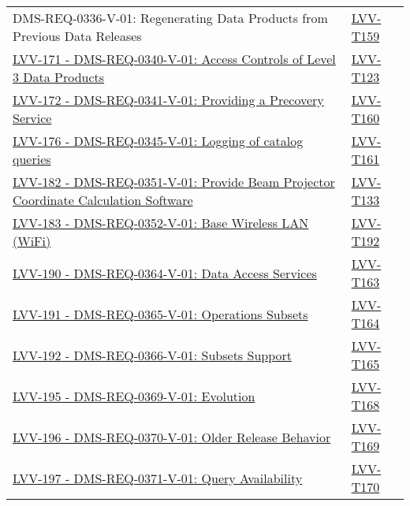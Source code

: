 \begin{longtable}[]{p{13cm}p{3cm}}
{DMS-REQ-0336-V-01: Regenerating Data Products from Previous Data
Releases} &
\protect\hyperlink{lvv-t159---verify-implementation-of-regenerating-data-products-from-previous-data-releases}{LVV-T159}\tabularnewline
\href{https://jira.lsstcorp.org/browse/LVV-171}{LVV-171 -
DMS-REQ-0340-V-01: Access Controls of Level 3 Data Products} &
\protect\hyperlink{lvv-t123---verify-implementation-of-access-controls-of-level-3-data-products}{LVV-T123}\tabularnewline
\href{https://jira.lsstcorp.org/browse/LVV-172}{LVV-172 -
DMS-REQ-0341-V-01: Providing a Precovery Service} &
\protect\hyperlink{lvv-t160---verify-implementation-of-providing-a-precovery-service}{LVV-T160}\tabularnewline
\href{https://jira.lsstcorp.org/browse/LVV-176}{LVV-176 -
DMS-REQ-0345-V-01: Logging of catalog queries} &
\protect\hyperlink{lvv-t161---verify-implementation-of-logging-of-catalog-queries}{LVV-T161}\tabularnewline
\href{https://jira.lsstcorp.org/browse/LVV-182}{LVV-182 -
DMS-REQ-0351-V-01: Provide Beam Projector Coordinate Calculation
Software} &
\protect\hyperlink{lvv-t133---verify-implementation-of-provide-beam-projector-coordinate-calculation-software}{LVV-T133}\tabularnewline
\href{https://jira.lsstcorp.org/browse/LVV-183}{LVV-183 -
DMS-REQ-0352-V-01: Base Wireless LAN (WiFi)} &
\protect\hyperlink{lvv-t192---verify-implementation-of-base-wireless-lan-wifi}{LVV-T192}\tabularnewline
\href{https://jira.lsstcorp.org/browse/LVV-190}{LVV-190 -
DMS-REQ-0364-V-01: Data Access Services} &
\protect\hyperlink{lvv-t163---verify-implementation-of-data-access-services}{LVV-T163}\tabularnewline
\href{https://jira.lsstcorp.org/browse/LVV-191}{LVV-191 -
DMS-REQ-0365-V-01: Operations Subsets} &
\protect\hyperlink{lvv-t164---verify-implementation-of-operations-subsets}{LVV-T164}\tabularnewline
\href{https://jira.lsstcorp.org/browse/LVV-192}{LVV-192 -
DMS-REQ-0366-V-01: Subsets Support} &
\protect\hyperlink{lvv-t165---verify-implementation-of-subsets-support}{LVV-T165}\tabularnewline
\href{https://jira.lsstcorp.org/browse/LVV-195}{LVV-195 -
DMS-REQ-0369-V-01: Evolution} &
\protect\hyperlink{lvv-t168---verify-design-of-data-access-services-allows-evolution-of-the-lsst-data-model}{LVV-T168}\tabularnewline
\href{https://jira.lsstcorp.org/browse/LVV-196}{LVV-196 -
DMS-REQ-0370-V-01: Older Release Behavior} &
\protect\hyperlink{lvv-t169---verify-implementation-of-older-release-behavior}{LVV-T169}\tabularnewline
\href{https://jira.lsstcorp.org/browse/LVV-197}{LVV-197 -
DMS-REQ-0371-V-01: Query Availability} &
\protect\hyperlink{lvv-t170---verify-implementation-of-query-availability}{LVV-T170}\tabularnewline
\bottomrule
\end{longtable}

